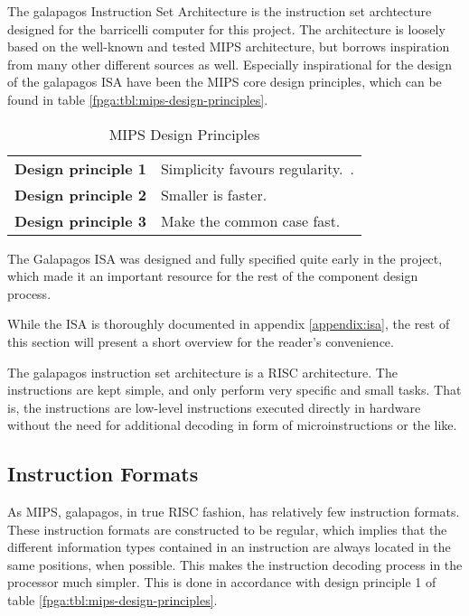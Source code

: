 The \Gls{galapagos} Instruction Set Architecture is the instruction set archtecture designed for the \Gls{barricelli} computer for this project.
The architecture is loosely based on the well-known and tested \gls{MIPS} architecture, but borrows inspiration from many other different sources as well.
Especially inspirational for the design of the \Gls{galapagos} ISA have been the \gls{MIPS} core design principles, which can be found in table \vref{fpga:tbl:mips-design-principles}.

\begin{table}[H]
\centering
    \begin{tabular}{l l} 
     \textbf{Design principle 1} & Simplicity favours regularity.~\cite[p.~79]{compOrgDes}. \\
     \textbf{Design principle 2} & Smaller is faster.~\cite[p.~81]{compOrgDes} \\
     \textbf{Design principle 3} & Make the common case fast.~\cite[p.~86]{compOrgDes} \\
    \hline
\end{tabular}
    \caption{MIPS Design Principles}
    \label{fpga:tbl:mips-design-principles}
\end{table}

The Galapagos ISA was designed and fully specified quite early in the project, which made it an important resource for the rest of the component design process.

While the ISA is thoroughly documented in appendix \vref{appendix:isa}, the rest of this section will present a short overview for the reader's convenience.

\bigskip
\bigskip

The \Gls{galapagos} instruction set architecture is a RISC architecture.
The instructions are kept simple, and only perform very specific and small tasks.
That is, the instructions are low-level instructions executed directly in hardware without the need for additional decoding in form of microinstructions or the like.

\subsection{Instruction Formats}

As \Gls{MIPS}, \Gls{galapagos}, in true \gls{RISC} fashion, has relatively few instruction formats.
These instruction formats are constructed to be regular, which implies that the different information types contained in an instruction are always located in the same positions, when possible.
This makes the instruction decoding process in the processor much simpler.
This is done in accordance with design principle 1 of table \vref{fpga:tbl:mips-design-principles}.

